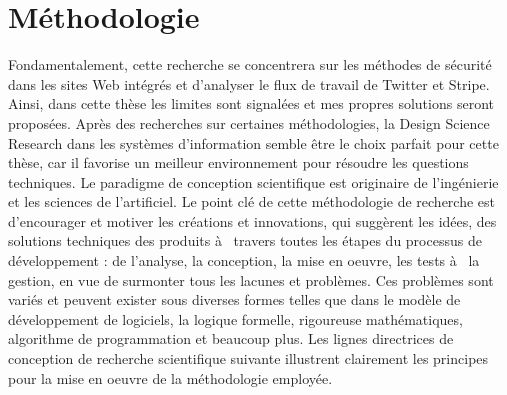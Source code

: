 \section{Méthodologie}
Fondamentalement, cette recherche se concentrera sur les méthodes de sécurité dans les sites Web
intégrés et d'analyser le flux de travail de Twitter et Stripe. Ainsi, dans cette thèse les limites sont
signalées et mes propres solutions seront proposées. Après des recherches sur certaines méthodologies,
la Design Science Research dans les systèmes d'information semble être le choix parfait pour cette
thèse, car il favorise un meilleur environnement pour résoudre les questions techniques. Le paradigme
de conception scientifique est originaire de l'ingénierie et les sciences de l'artificiel. Le point clé de cette
méthodologie de recherche est d'encourager et motiver les créations et innovations, qui suggèrent les
idées, des solutions techniques des produits à  travers toutes les étapes du processus de développement
: de l'analyse, la conception, la mise en oeuvre, les tests à  la gestion, en vue de surmonter tous les
lacunes et problèmes. Ces problèmes sont variés et peuvent exister sous diverses formes telles que dans
le modèle de développement de logiciels, la logique formelle, rigoureuse mathématiques, algorithme de
programmation et beaucoup plus. Les lignes directrices de conception de recherche scientifique suivante
illustrent clairement les principes pour la mise en oeuvre de la méthodologie employée.

\newpage


